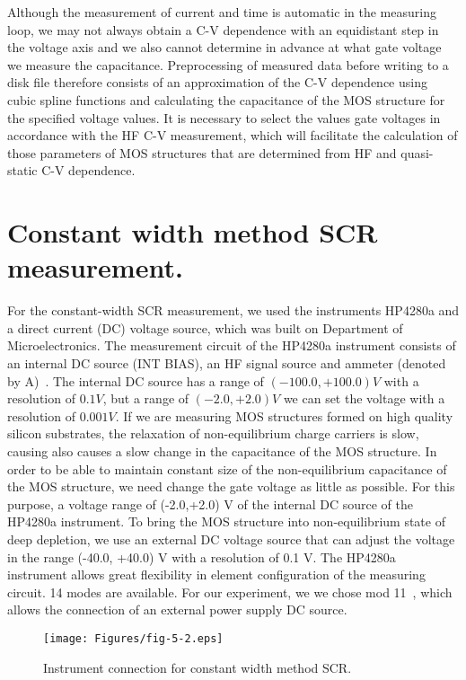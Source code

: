Although the measurement of current and time is automatic in the
measuring loop, we may not always obtain a C-V dependence with an
equidistant step in the voltage axis and we also cannot determine in
advance at what gate voltage we measure the capacitance.
Preprocessing of measured data before writing to a disk file therefore
consists of an approximation of the C-V dependence using cubic spline
functions and calculating the capacitance of the MOS structure for the
specified voltage values. It is necessary to select the values gate
voltages in accordance with the HF C-V measurement, which will
facilitate the calculation of those parameters of MOS structures that
are determined from HF and quasi-static C-V dependence.

\section{Constant width method SCR measurement.}\label{sec:5.3}

For the constant-width SCR measurement, we used the instruments
HP4280a and a direct current (DC) voltage source, which was built on
Department of Microelectronics. The measurement circuit of the HP4280a
instrument consists of an internal DC source (INT BIAS), an HF signal
source and ammeter (denoted by A)~\cite{5.7}. The internal DC source
has a range of $(-100.0,+100.0)V$ with a resolution of $0.1V$, but a
range of $(-2.0,+2.0)V$ we can set the voltage with a resolution of
$0.001V$. If we are measuring MOS structures formed on high quality
silicon substrates, the relaxation of non-equilibrium charge carriers
is slow, causing also causes a slow change in the capacitance of the
MOS structure.  In order to be able to maintain constant size of the
non-equilibrium capacitance of the MOS structure, we need change the
gate voltage as little as possible. For this purpose, a voltage range
of (-2.0,+2.0) V of the internal DC source of the HP4280a
instrument. To bring the MOS structure into non-equilibrium state of
deep depletion, we use an external DC voltage source that can adjust
the voltage in the range (-40.0, +40.0) V with a resolution of 0.1
V. The HP4280a instrument allows great flexibility in element
configuration of the measuring circuit. 14 modes are available. For
our experiment, we we chose mod 11~\cite{5.2}, which allows the
connection of an external power supply DC source.

\begin{figure}[h!]\centering
  \texttt{[image: Figures/fig-5-2.eps]}
  \caption[Instrument wiring for constant width method
    SCR]{Instrument connection for constant width method
    SCR.}\label{fig:5.2}
\end{figure}

